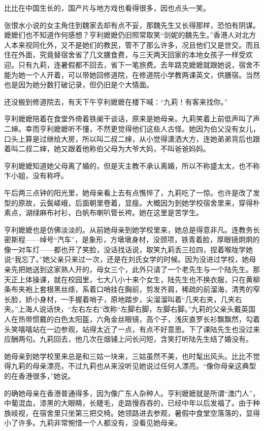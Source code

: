 \par 比比在中国生长的，国产片与地方戏也看得很多，因也点头一笑。
\par 张恨水小说的女主角住到魏家去却有点不妥，那魏先生又长得那样，恐怕有阴谋。嬷嬷们也不知道作何感想？亨利嬷嬷仍旧照常取笑“剑妮的魏先生。”香港人对北方人本来视同化外，又不是她们的教民，管不了那么许多，况且他们又是世交。而且住在外面，究竟替宿舍省了几文膳食费，与三天两天回家的本地女孩子一样受欢迎。只有九莉，连暑假都不回去，省下一笔旅费。去年路克嬷嬷就跟她说，宿舍不能为她一个人开着，可以带她回修道院，在修道院小学教两课英文，供膳宿。当然也是因为她分数打破记录，但仍旧是个大情面。
\par 还没搬到修道院去，有天下午亨利嬷嬷在楼下喊：“九莉！有客来找你。”
\par 亨利嬷嬷陪着在食堂外倚着铁阑干谈话，原来是她母亲。九莉笑着上前低声叫了声二婶。幸而亨利嬷嬷听不懂，不然更觉得他们这些人古怪。她因为伯父没有女儿，口头上算是过继给大房，所以叫二叔二婶，从小觉得潇洒大方，连她弟弟背后也跟着叫二叔二婶，她又跟着他称伯父母为大爷大妈，不叫爸爸妈妈。
\par 亨利嬷嬷知道她父母离了婚的，但是天主教不承认离婚，所以不称盛太太，也不称卞小姐，没有称呼。
\par 午后两三点钟的阳光里，她母亲看上去有点憔悴了，九莉吃了一惊。也许是改了发型的原故，云鬓嵯峨，后面朝里卷着，显瘦。大概因为到她学校宿舍里来，穿得朴素点，湖绿麻布衬衫，白帆布喇叭管长袴。她在这里是苦学生。
\par 亨利嬷嬷也是仿佛淡淡的。从前她母亲到她学校里来，她总是得意非凡。连教务长密斯程——绰号“汽车”，是象形，方墩墩身材，没颈项，铁青着脸，厚眼镜炯炯的像一对车灯——都也开了笑脸，没话找话说，取笑九莉丢三拉四，捏着喉咙学她说“我忘了。”她父亲只来过一次，还是在刘氏女学的时候。因为没进过学校，她母亲先把她送到这家熟人开的，母女三个，此外只请了一个老先生与一个陆先生。那天正上体操课，就在校园里，七大八小十来个女生，陆先生也不换衣服，只在黄柳条布夹袍上套根黑丝绦，系着口哨挂在胸前，剪发齐肩，稀疏的前溜海，清秀的窄长脸，娇小身材，一手握着哨子，原地踏步，尖溜溜叫着“几夹右夹，几夹右夹。”上海人说话快，“左右左右”改称“左脚右脚，左脚右脚。”九莉的父亲头戴英国人在热带惯戴的白色太阳盔，六角金丝眼镜，高个子，浅灰直罗长衫飘飘然，勾着头笑嘻嘻站在一边参观，站得太近了一点，有点不好意思。下了课陆先生也没过来应酬两句。九莉回去，他几次在烟铺上问长问短，含笑打听陆先生结了婚没有。
\par 她母亲到她学校里来总是和三姑一块来，三姑虽然不美，也时髦出风头。比比不觉得九莉的母亲漂亮，不过九莉也从来没听见她说过任何人漂亮。“像你母亲这典型的在香港很多，”她说。
\par 的确她母亲在香港普通得多，因为像广东人杂种人。亨利嬷嬷就是所谓“澳门人”，中葡混血，漆黑的大眼睛，长睫毛，走路慢吞吞的，已经中年以后发福了。由于种族岐视，在宿舍里只坐第三把交椅。她领路进去参观，暑假中食堂空落落的，显得小了许多。九莉非常惋惜一个人都没有，没看见她母亲。
